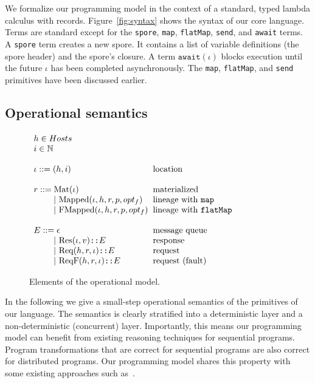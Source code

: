 \documentclass{jfp1}
\newcommand{\gap}{\quad\quad}
\newcommand{\ba}{\begin{array}}
\newcommand{\ea}{\end{array}}
\begin{document}
We formalize our programming model in the context of a standard, typed lambda
calculus with records. Figure~\ref{fig:syntax} shows the syntax of our core
language. Terms are standard except for the \texttt{spore}, \texttt{map},
\texttt{flatMap}, \texttt{send}, and \texttt{await} terms. A \texttt{spore}
term creates a new spore. It contains a list of variable definitions (the spore
header) and the spore's closure. A term $\texttt{await}(\iota)$ blocks
execution until the future $\iota$ has been completed asynchronously. The
\texttt{map}, \texttt{flatMap}, and \texttt{send} primitives have been
discussed earlier.

\subsection{Operational semantics}
\label{sec:opsem}

\begin{figure}[ht!]
  \centering

  $\ba[t]{l@{\hspace{2mm}}l}
h \in Hosts &
\\
i \in \mathbb{N} &
\\
 & \\
\iota  ::=  (h, i)                               & \mbox{location}
\\
 & \\
r ::=     \mbox{Mat}(\iota) & \mbox{materialized}
\\
\gap ~|~  \mbox{Mapped}(\iota, h, r, p, opt_f)   & \mbox{lineage with \texttt{map}}
\\
\gap ~|~  \mbox{FMapped}(\iota, h, r, p, opt_f)  & \mbox{lineage with \texttt{flatMap}}
\\
 & \\
E      ::=  \epsilon & \mbox{message queue}
\\
\gap ~|~    \mbox{Res}(\iota, v) \texttt{::} E      & \mbox{response}
\\
\gap ~|~    \mbox{Req}(h, r, \iota) \texttt{::} E   & \mbox{request}
\\
\gap ~|~    \mbox{ReqF}(h, r, \iota) \texttt{::} E  & \mbox{request (fault)}
\\
  \ea$

  \vspace{1mm}
  \caption{Elements of the operational model.}
  \label{fig:elems-opsem}
  \vspace{1mm}
\end{figure}

In the following we give a small-step operational semantics of the primitives
of our language. The semantics is clearly stratified into a deterministic layer
and a non-deterministic (concurrent) layer. Importantly, this means our
programming model can benefit from existing reasoning techniques for sequential
programs. Program transformations that are correct for sequential programs are
also correct for distributed programs. Our programming model shares this
property with some existing approaches such as~\cite{ConcurrentHaskell}.
\end{document}
